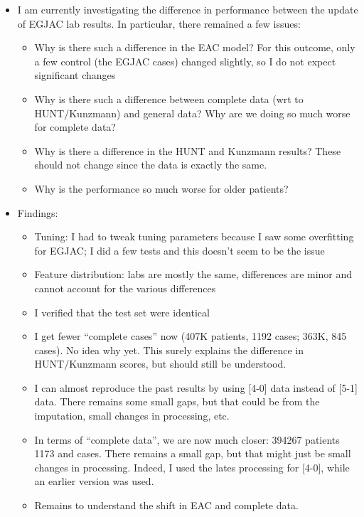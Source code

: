 \documentclass[12pt]{article}
\begin{document}
\begin{itemize}
\item I am currently investigating the difference in performance between the update of EGJAC lab results. 
In particular, there remained a few issues:
\begin{itemize}
	\item Why is there such a difference in the EAC model? For this outcome, only a few control 
	(the EGJAC cases) changed slightly, so I do not expect significant changes
	\item Why is there such a difference between complete data (wrt to HUNT/Kunzmann) and general data? 
	Why are we doing so much worse for complete data? 
	\item Why is there a difference in the HUNT and Kunzmann results? These should not change since the data is exactly the same.
	\item Why is the performance so much worse for older patients? 
\end{itemize}
\item Findings:
\begin{itemize}
	\item Tuning: I had to tweak tuning parameters because I saw some overfitting for EGJAC; I did a few tests and this doesn't seem to be the issue
	\item Feature distribution: labs are mostly the same, differences are minor and cannot account for the various differences
	\item I verified that the test set were identical
	\item I get fewer ``complete cases'' now (407K patients, 1192 cases; 363K, 845 cases). No idea why yet. 
	This surely explains the difference in HUNT/Kunzmann scores, but should still be understood. 
	\item I can almost reproduce the past results by using [4-0] data instead of [5-1] data. There remains some small gaps, but that could be from
	the imputation, small changes in processing, etc.
	\item In terms of ``complete data'', we are now much closer: 394267 patients 1173 and cases. There remains a small gap, but that might just be small changes in processing. 
	Indeed, I used the lates processing for [4-0], while an earlier version was used.
	\item Remains to understand the shift in EAC and complete data.
\end{itemize}
\end{itemize}
\end{document}
